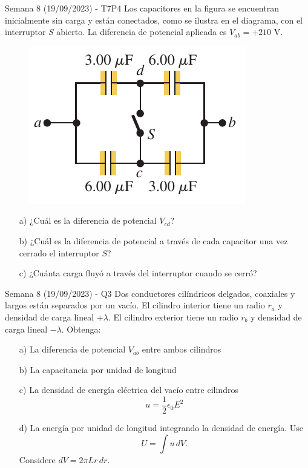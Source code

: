 \begin{frame}{Semana 8 (19/09/2023) - T7P4}
    Los capacitores en la figura se encuentran inicialmente sin carga y están conectados, como se ilustra en el diagrama, con el interruptor $S$ abierto. La diferencia de potencial aplicada es $V_{ab} = +210 \text{ V}$.

    \begin{figure}[H]
        \centering
        \includegraphics[scale=0.4]{figures/t7p4.png}
    \end{figure}
    
    \begin{itemize}
        \item[a)] ¿Cuál es la diferencia de potencial $V_{cd}$?
        \item[b)] ¿Cuál es la diferencia de potencial a través de cada capacitor una vez cerrado el interruptor $S$?
        \item[c)] ¿Cuánta carga fluyó a través del interruptor cuando se cerró?
    \end{itemize}
    
\end{frame}

\begin{frame}{Semana 8 (19/09/2023) - Q3}
    Dos conductores cilíndricos delgados, coaxiales y largos están separados por un vacío. El cilindro interior tiene un radio $r_a$ y densidad de carga lineal $+\lambda$. El cilindro exterior tiene un radio $r_b$ y densidad de carga lineal $-\lambda$. Obtenga:
    
    \begin{itemize}
        \item[a)] La diferencia de potencial $V_{ab}$ entre ambos cilindros 
        \item[b)] La capacitancia por unidad de longitud
        \item[c)] La densidad de energía eléctrica del vacío entre cilindros $$u=\frac{1}{2}\epsilon_0 E^2$$
        \item[d)] La energía por unidad de longitud integrando la densidad de energía. Use $$U=\int u\, dV.$$ Considere $dV=2\pi Lr\,dr$.
    \end{itemize}
\end{frame}

